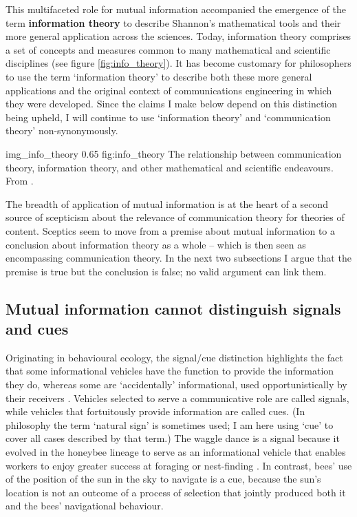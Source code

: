 \documentclass[12pt]{article}
\begin{document}
\noindent This multifaceted role for mutual information accompanied the emergence of the term \textbf{information theory} to describe Shannon's mathematical tools and their more general application across the sciences.
Today, information theory comprises a set of concepts and measures common to many mathematical and scientific disciplines (see figure \ref{fig:info_theory}).
It has become customary for philosophers to use the term `information theory' to describe both these more general applications and the original context of communications engineering in which they were developed.
Since the claims I make below depend on this distinction being upheld, I will continue to use `information theory' and `communication theory' non-synonymously.

\begin{myfig}
    {img_info_theory} %
    {0.65} %
    {fig:info_theory} %
    {The relationship between communication theory, information theory, and other mathematical and scientific endeavours.
    From \citet[p. 2, fig. 1.1]{cover2006elements}.
    } %
\end{myfig}

The breadth of application of mutual information is at the heart of a second source of scepticism about the relevance of communication theory for theories of content.
Sceptics seem to move from a premise about mutual information to a conclusion about information theory as a whole -- which is then seen as encompassing communication theory.
In the next two subsections I argue that the premise is true but the conclusion is false; no valid argument can link them.

\subsection{Mutual information cannot distinguish signals and cues}


Originating in behavioural ecology, the signal/cue distinction highlights the fact that some informational vehicles have the function to provide the information they do, whereas some are `accidentally' informational, used opportunistically by their receivers \citep[$\S$1.2]{maynardsmith2003animal}.
Vehicles selected to serve a communicative role are called signals, while vehicles that fortuitously provide information are called cues.
(In philosophy the term `natural sign' is sometimes used; I am here using `cue' to cover all cases described by that term.)
The waggle dance is a signal because it evolved in the honeybee lineage to serve as an informational vehicle that enables workers to enjoy greater success at foraging or nest-finding \citep{gould1975honey,riley2005flight}.
In contrast, bees' use of the position of the sun in the sky to navigate is a cue, because the sun's location is not an outcome of a process of selection that jointly produced both it and the bees' navigational behaviour.
\end{document}
